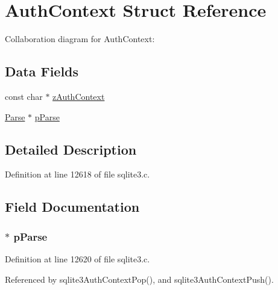 \hypertarget{struct_auth_context}{}\section{Auth\+Context Struct Reference}
\label{struct_auth_context}


Collaboration diagram for Auth\+Context\+:
\subsection*{Data Fields}
\begin{DoxyCompactItemize}
\item 
const char $\ast$ \hyperlink{struct_auth_context_a7daea745aae6a12901c52fd4f28608dc}{z\+Auth\+Context}
\item 
\hyperlink{struct_parse}{Parse} $\ast$ \hyperlink{struct_auth_context_ac700bf257b32cd7e491fde90a081379d}{p\+Parse}
\end{DoxyCompactItemize}


\subsection{Detailed Description}


Definition at line 12618 of file sqlite3.\+c.



\subsection{Field Documentation}
\hypertarget{struct_auth_context_ac700bf257b32cd7e491fde90a081379d}{}
\subsubsection[{p\+Parse}]{$\ast$ p\+Parse}\label{struct_auth_context_ac700bf257b32cd7e491fde90a081379d}


Definition at line 12620 of file sqlite3.\+c.



Referenced by sqlite3\+Auth\+Context\+Pop(), and sqlite3\+Auth\+Context\+Push().

\hypertarget{struct_auth_context_a7daea745aae6a12901c52fd4f28608dc}{}
